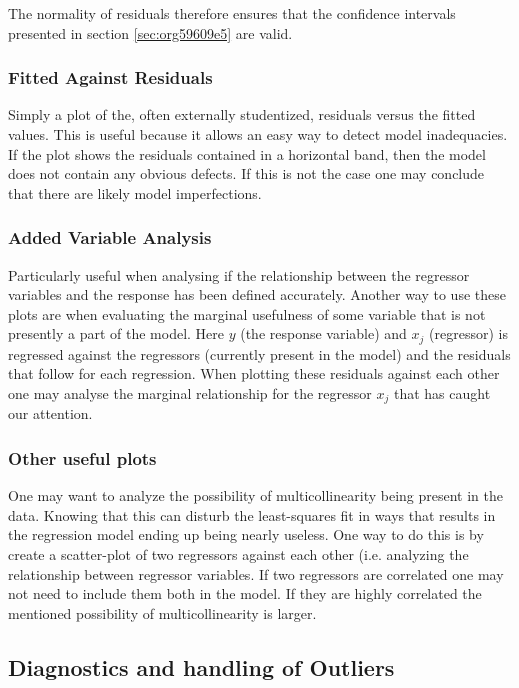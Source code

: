 \documentclass[11pt]{article}
\begin{document}
The normality of residuals therefore ensures that the confidence intervals presented in section \ref{sec:org59609e5}
are valid.

\subsubsection{Fitted Against Residuals}
\label{sec:orgf00a689}

Simply a plot of the, often externally studentized, residuals versus the fitted values. This is useful
because it allows an easy way to detect model inadequacies. If the plot shows the residuals contained in
a horizontal band, then the model does not contain any obvious defects. If this is not the case one may
conclude that there are likely model imperfections.
\subsubsection{Added Variable Analysis}
\label{sec:orgde21f2e}

Particularly useful when analysing if the relationship between the regressor variables and the response
has been defined accurately. Another way to use these plots are when evaluating the marginal usefulness
of some variable that is not presently a part of the model. Here \(y\) (the response variable) and \(x_j\)
(regressor) is regressed against the regressors (currently present in the model) and the residuals that
follow for each regression. When plotting these residuals against each other one may analyse the marginal
relationship for the regressor \(x_j\) that has caught our attention.

\subsubsection{Other useful plots}
\label{sec:org22b66fc}

One may want to analyze the possibility of multicollinearity being present in the data. Knowing that
this can disturb the least-squares fit in ways that results in the regression model ending up being
nearly useless. One way to do this is by create a scatter-plot of two regressors against each other
(i.e. analyzing the relationship between regressor variables. If two regressors are correlated one 
may not need to include them both in the model. If they are highly correlated the mentioned possibility 
of multicollinearity is larger. 

\subsection{Diagnostics and handling of Outliers}
\label{sec:org0998c04}
\end{document}
